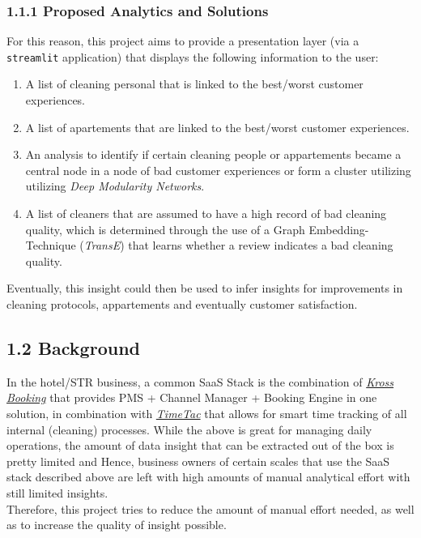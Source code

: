 \documentclass[
]{article}
\begin{document}
\subsubsection{1.1.1 Proposed Analytics and
Solutions}\label{proposed-analytics-and-solutions}

For this reason, this project aims to provide a presentation layer (via
a \texttt{streamlit} application) that displays the following
information to the user: 

\begin{enumerate}
  \item A list of cleaning personal that is linked to the best/worst customer experiences.  
  \item A list of apartements that are linked to the best/worst customer experiences. 
  \item An analysis to identify if certain cleaning people or appartements became a central node in a node of bad customer experiences or form a cluster utilizing utilizing \emph{Deep Modularity Networks}.
  \item A list of cleaners that are assumed to have a high record of bad cleaning quality, which is determined through the use of a Graph Embedding-Technique (\emph{TransE}) that learns whether a review indicates a bad cleaning quality.
  
\end{enumerate}
 
Eventually, this insight could then be used to infer insights for
improvements in cleaning protocols, appartements and eventually customer
satisfaction.

\subsection{1.2 Background}\label{background}

In the hotel/STR business, a common SaaS Stack is the combination of
\href{https://www.krossbooking.com/en}{\textit{Kross Booking}} that provides PMS
+ Channel Manager + Booking Engine in one solution, in combination with
\href{https://www.timetac.com/en/}{\textit{TimeTac}} that allows for smart time
tracking of all internal (cleaning) processes. While the above is great
for managing daily operations, the amount of data insight that can be
extracted out of the box is pretty limited and Hence, business owners of
certain scales that use the SaaS stack described above are left with
high amounts of manual analytical effort with still limited insights.\\
Therefore, this project tries to reduce the amount of manual effort
needed, as well as to increase the quality of insight possible.
\end{document}
